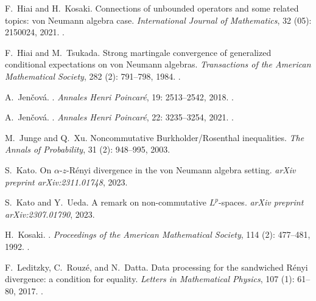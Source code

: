 \documentclass[12pt]{article}
\theoremstyle{definition}
\theoremstyle{remark}
\numberwithin{equation}{section}
\begin{document}
\begin{thebibliography}{24}
F.~Hiai and H.~Kosaki.
\newblock Connections of unbounded operators and some related topics: von
  {N}eumann algebra case.
\newblock \emph{International Journal of Mathematics}, 32
  (05): 2150024, 2021.
\newblock {}.

F.~Hiai and M.~Tsukada.
\newblock Strong martingale convergence of generalized conditional expectations
  on von {N}eumann algebras.
\newblock \emph{Transactions of the American Mathematical Society},
  282 (2): 791--798, 1984.
\newblock {}.

A.~Jen{\v c}ov{\'a}.
.
\newblock \emph{Annales Henri Poincar{\'e}}, 19: 2513--2542, 2018.
\newblock {}.

A.~Jen{\v{c}}ov{\'a}.
.
\newblock \emph{Annales Henri Poincar{\'e}}, 22: 3235–3254, 2021.
\newblock {}.

M.~Junge and Q.~Xu.
\newblock Noncommutative {B}urkholder/{R}osenthal inequalities.
\newblock \emph{The Annals of Probability}, 31 (2): 948--995,
  2003.

S.~Kato.
\newblock On $\alpha $-$ z $-{R}\'enyi divergence in the von {N}eumann algebra
  setting.
\newblock \emph{arXiv preprint arXiv:2311.01748}, 2023.

S.~Kato and Y.~Ueda.
\newblock A remark on non-commutative {$L^p$}-spaces.
\newblock \emph{arXiv preprint arXiv:2307.01790}, 2023.

H.~Kosaki.
.
\newblock \emph{Proceedings of the American Mathematical Society}, 114
  (2): 477--481, 1992.
\newblock {}.

F.~Leditzky, C.~Rouz{\'e}, and N.~Datta.
\newblock Data processing for the sandwiched {R}{\'e}nyi divergence: a
  condition for equality.
\newblock \emph{Letters in Mathematical Physics}, 107 (1):
  61--80, 2017.
\newblock {}.


\end{thebibliography}
\end{document}
